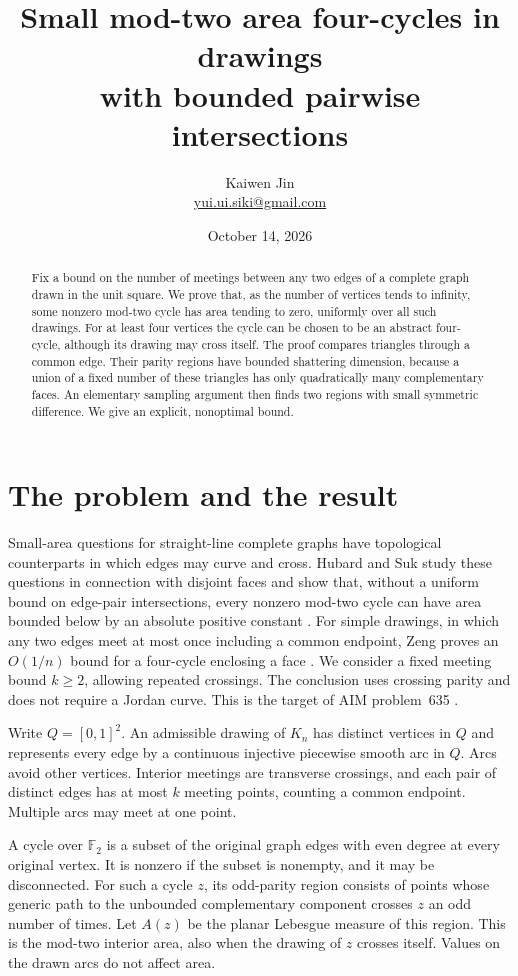 \documentclass[11pt]{article}
\title{Small mod-two area four-cycles in drawings\protect\\ with bounded pairwise intersections}
\author{Kaiwen Jin\\\small\href{mailto:yui.ui.siki@gmail.com}{yui.ui.siki@gmail.com}}
\date{October 14, 2026}
\newcommand{\F}{\mathbb F_2}
\begin{document}
\maketitle
\begin{abstract}
Fix a bound on the number of meetings between any two edges of a complete graph drawn in the unit square. We prove that, as the number of vertices tends to infinity, some nonzero mod-two cycle has area tending to zero, uniformly over all such drawings. For at least four vertices the cycle can be chosen to be an abstract four-cycle, although its drawing may cross itself. The proof compares triangles through a common edge. Their parity regions have bounded shattering dimension, because a union of a fixed number of these triangles has only quadratically many complementary faces. An elementary sampling argument then finds two regions with small symmetric difference. We give an explicit, nonoptimal bound.
\end{abstract}

\section{The problem and the result}

Small-area questions for straight-line complete graphs have topological counterparts in which edges may curve and cross. Hubard and Suk study these questions in connection with disjoint faces and show that, without a uniform bound on edge-pair intersections, every nonzero mod-two cycle can have area bounded below by an absolute positive constant \cite[Section~5, Proposition~5.1]{HS}. For simple drawings, in which any two edges meet at most once including a common endpoint, Zeng proves an $O(1/n)$ bound for a four-cycle enclosing a face \cite[Theorem~1.1 and Corollary~1.2]{Zeng}. We consider a fixed meeting bound $k\ge2$, allowing repeated crossings. The conclusion uses crossing parity and does not require a Jordan curve. This is the target of AIM problem~635 \cite{AIM}.

Write $Q=[0,1]^2$. An admissible drawing of $K_n$ has distinct vertices in $Q$ and represents every edge by a continuous injective piecewise smooth arc in $Q$. Arcs avoid other vertices. Interior meetings are transverse crossings, and each pair of distinct edges has at most $k$ meeting points, counting a common endpoint. Multiple arcs may meet at one point.

A cycle over $\F$ is a subset of the original graph edges with even degree at every original vertex. It is nonzero if the subset is nonempty, and it may be disconnected. For such a cycle $z$, its odd-parity region consists of points whose generic path to the unbounded complementary component crosses $z$ an odd number of times. Let $A(z)$ be the planar Lebesgue measure of this region. This is the mod-two interior area, also when the drawing of $z$ crosses itself. Values on the drawn arcs do not affect area.
\end{document}

